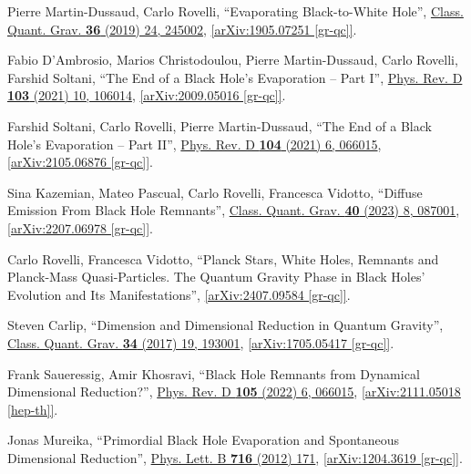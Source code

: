 \documentclass[12pt,preprintnumbers, floatfix, preprintnumbers, letterpaper, superscriptaddress,nofootinbib]{revtex4-2}
\begin{document}
\begin{thebibliography}{99}
Pierre Martin-Dussaud, Carlo Rovelli, ``Evaporating Black-to-White Hole'', {\href{https://iopscience.iop.org/article/10.1088/1361-6382/ab5097}{Class. Quant. Grav. \textbf{36} (2019) 24, 245002}}, \href{https://arxiv.org/abs/1905.07251}{[arXiv:1905.07251 [gr-qc]]}.

Fabio D'Ambrosio, Marios Christodoulou, Pierre Martin-Dussaud, Carlo Rovelli, Farshid Soltani, ``The End of a Black Hole's Evaporation -- Part I'', {\href{https://journals.aps.org/prd/abstract/10.1103/PhysRevD.103.106014}{Phys. Rev. D \textbf{103} (2021) 10, 106014}}, \href{https://arxiv.org/abs/2009.05016}{[arXiv:2009.05016 [gr-qc]]}.

Farshid Soltani, Carlo Rovelli, Pierre Martin-Dussaud, ``The End of a Black Hole's Evaporation -- Part II'', {\href{https://journals.aps.org/prd/abstract/10.1103/PhysRevD.104.066015}{Phys. Rev. D \textbf{104} (2021) 6, 066015}}, \href{https://arxiv.org/abs/2105.06876}{[arXiv:2105.06876 [gr-qc]]}.

Sina Kazemian, Mateo Pascual, Carlo Rovelli, Francesca Vidotto, ``Diffuse Emission From Black Hole Remnants'', {\href{https://iopscience.iop.org/article/10.1088/1361-6382/acc232}{Class. Quant. Grav. \textbf{40} (2023) 8, 087001}}, \href{https://arxiv.org/abs/2207.06978}{[arXiv:2207.06978 [gr-qc]]}.

Carlo Rovelli, Francesca Vidotto, ``Planck Stars, White Holes, Remnants and Planck-Mass Quasi-Particles. The Quantum Gravity Phase in Black Holes’ Evolution and Its Manifestations'', \href{https://arxiv.org/abs/2407.09584}{[arXiv:2407.09584 [gr-qc]]}.


Steven Carlip, ``Dimension and Dimensional Reduction in Quantum Gravity'', {\href{https://iopscience.iop.org/article/10.1088/1361-6382/aa8535}{Class. Quant. Grav. \textbf{34} (2017) 19, 193001}}, \href{https://arxiv.org/abs/1705.05417}{[arXiv:1705.05417 [gr-qc]]}.

Frank Saueressig, Amir Khosravi, ``Black Hole Remnants from Dynamical Dimensional Reduction?'', {\href{https://journals.aps.org/prd/abstract/10.1103/PhysRevD.105.066015}{Phys. Rev. D \textbf{105} (2022) 6, 066015}}, \href{https://arxiv.org/abs/2111.05018}{[arXiv:2111.05018 [hep-th]]}.


Jonas Mureika, ``Primordial Black Hole Evaporation and Spontaneous Dimensional Reduction'', {\href{https://www.sciencedirect.com/science/article/pii/S0370269312008660?via\%3Dihub}{Phys. Lett. B \textbf{716} (2012) 171}}, \href{https://arxiv.org/abs/1204.3619}{[arXiv:1204.3619 [gr-qc]]}.


\end{thebibliography}
\end{document}
